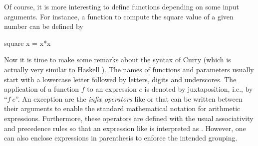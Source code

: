 Of course, it is more interesting to define functions depending
on some input arguments. For instance, a function to compute the
square value of a given number can be defined by
\begin{curry}
square x = x*x
\end{curry}
Now it is time to make some remarks about the syntax
of Curry (which is actually very similar to
Haskell \cite{PeytonJones03Haskell}).
The names of functions and parameters usually start with
a lowercase letter followed by letters, digits and underscores.
The application of a function $f$ to an expression $e$ is denoted
by juxtaposition, i.e., by ``$f~e$''. An exception are the
\emph{infix operators}%
like \code{+} or \code{*} that can be written between
their arguments to enable the standard mathematical notation
for arithmetic expressions. Furthermore, these operators
are defined with the usual associativity and precedence rules
so that an expression like  is interpreted
as . However, one can also enclose
expressions in parenthesis to enforce the intended grouping.


